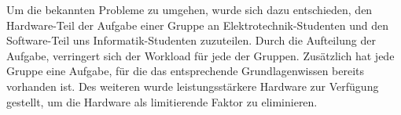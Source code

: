     Um die bekannten Probleme zu umgehen, wurde sich dazu entschieden, den Hardware-Teil der Aufgabe einer Gruppe an Elektrotechnik-Studenten und den Software-Teil uns Informatik-Studenten zuzuteilen.
    Durch die Aufteilung der Aufgabe, verringert sich der Workload für jede der Gruppen. 
    Zusätzlich hat jede Gruppe eine Aufgabe, für die das entsprechende Grundlagenwissen bereits vorhanden ist.
    Des weiteren wurde leistungsstärkere Hardware zur Verfügung gestellt, um die Hardware als limitierende Faktor zu eliminieren.

\newpage
